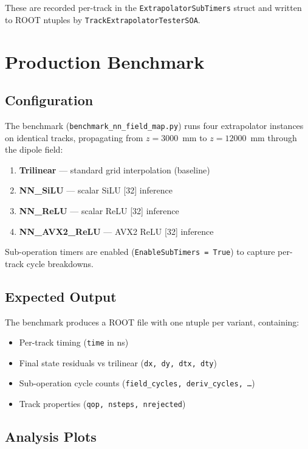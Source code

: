 \documentclass[11pt,a4paper]{article}
\begin{document}
These are recorded per-track in the \texttt{ExtrapolatorSubTimers} struct
and written to ROOT ntuples by \texttt{TrackExtrapolatorTesterSOA}.

\section{Production Benchmark}
\label{sec:benchmark}

\subsection{Configuration}

The benchmark (\texttt{benchmark\_nn\_field\_map.py}) runs four extrapolator
instances on identical tracks, propagating from $z = 3000$~mm to
$z = 12000$~mm through the dipole field:

\begin{enumerate}[nosep]
  \item \textbf{Trilinear} --- standard grid interpolation (baseline)
  \item \textbf{NN\_SiLU} --- scalar SiLU [32] inference
  \item \textbf{NN\_ReLU} --- scalar ReLU [32] inference
  \item \textbf{NN\_AVX2\_ReLU} --- AVX2 ReLU [32] inference
\end{enumerate}

Sub-operation timers are enabled (\texttt{EnableSubTimers = True}) to
capture per-track cycle breakdowns.

\subsection{Expected Output}

The benchmark produces a ROOT file with one ntuple per variant, containing:
\begin{itemize}[nosep]
  \item Per-track timing (\texttt{time} in ns)
  \item Final state residuals vs trilinear (\texttt{dx, dy, dtx, dty})
  \item Sub-operation cycle counts (\texttt{field\_cycles, deriv\_cycles, \ldots})
  \item Track properties (\texttt{qop, nsteps, nrejected})
\end{itemize}

\subsection{Analysis Plots}
\end{document}
